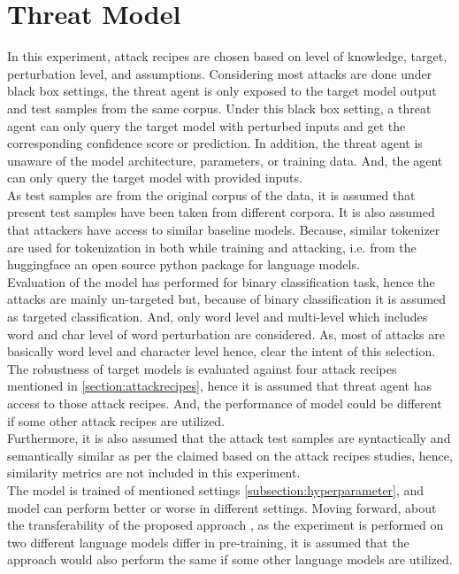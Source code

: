 \documentclass[%
	BCOR=8mm, %
	DIV=12,
	toc=bibliography, %
	toc=listof, %
	oneside, %
	egregdoesnotlikesansseriftitles, %
	]{scrbook}
\begin{document}
\section{Threat Model}
\label{section:threadmodel}
In this experiment, attack recipes are chosen based on level of knowledge, target, perturbation level, and assumptions. Considering most attacks are done under black box settings, the threat agent is only exposed to the target model output and test samples from the same corpus. Under this black box setting, a threat agent can only query the target model with perturbed inputs and get the corresponding confidence score or prediction. In addition, the threat agent is unaware of the model architecture, parameters, or training data. And, the agent can only query the target model with provided inputs. \\
As test samples are from the original corpus of the data, it is assumed that present test samples have been taken from different corpora. It is also assumed that attackers have access to similar baseline models. Because, similar tokenizer are used for tokenization in both while training and attacking, i.e. from the huggingface \cite{noauthor_hugging_nodate}  an open source python package for language models.\\
Evaluation of the model has performed for binary classification task, hence the attacks are mainly un-targeted but, because of binary classification it is assumed as targeted classification. And, only word level and multi-level which includes word and char level of word perturbation are considered. As, most of attacks are basically word level and character level hence, clear the intent of this selection.\\
The robustness of target models is evaluated against four attack recipes mentioned in \ref{section:attackrecipes}, hence it is assumed that threat agent has access to those attack recipes. And, the performance of model could be different if some other attack recipes are utilized.\\
 Furthermore, it is also assumed that the attack test samples are syntactically and semantically similar as per the claimed based on the attack recipes studies, hence, similarity metrics are not included in this experiment.\\
 The model is trained of mentioned settings  \ref{subsection:hyperparameter}, and model can perform better or worse in different settings. Moving forward, about the transferability of the proposed approach , as the experiment is performed on two different language models differ in pre-training, it is assumed that the approach would also perform the same if some other language models are utilized. 
\end{document}
